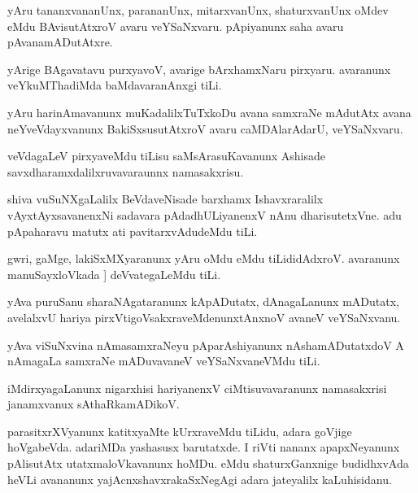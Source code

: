 \documentclass{article}
\begin{document}
\begin{mn}%
yAru tananxvananUnx, parananUnx, mitarxvanUnx, shaturxvanUnx oMdev eMdu BAvisutAtxroV 
avaru veYSaNxvaru. pApiyanunx saha avaru pAvanamADutAtxre.
\end{mn}

\begin{mn}%
yArige BAgavatavu purxyavoV, avarige bArxhamxNaru pirxyaru. avaranunx veYkuMThadiMda 
baMdavaranAnxgi tiLi.
\end{mn}

\begin{mn}%
yAru harinAmavanunx muKadalilxTuTxkoDu avana samxraNe mAdutAtx avana neYveVdayxvanunx 
BakiSxsusutAtxroV avaru caMDAlarAdarU, veYSaNxvaru.
\end{mn}

\begin{mn}%
veVdagaLeV pirxyaveMdu tiLisu saMsArasuKavanunx Ashisade savxdharamxdalilxruvavaraunnx 
namasakxrisu.
\end{mn}

\begin{mn}%
shiva vuSuNXgaLalilx BeVdaveNisade barxhamx Ishavxraralilx vAyxtAyxsavanenxNi sadavara 
pAdadhULiyanenxV nAnu dharisutetxVne. adu pApaharavu matutx ati pavitarxvAdudeMdu tiLi.
\end{mn}

\begin{mn}%
gwri, gaMge, lakiSxMXyaranunx yAru oMdu eMdu tiLididAdxroV. avaranunx manuSayxloVkada ]
deVvategaLeMdu tiLi.
\end{mn}

\begin{mn}%
yAva puruSanu sharaNAgataranunx kApADutatx, dAnagaLanunx mADutatx, avelalxvU hariya 
pirxVtigoVsakxraveMdenunxtAnxnoV avaneV veYSaNxvanu.
\end{mn}

\begin{mn}%
yAva viSuNxvina nAmasamxraNeyu pAparAshiyanunx nAshamADutatxdoV A nAmagaLa samxraNe 
mADuvavaneV veYSaNxvaneVMdu tiLi.
\end{mn}

\begin{mn}%
iMdirxyagaLanunx nigarxhisi hariyanenxV ciMtisuvavaranunx namasakxrisi janamxvanux 
sAthaRkamADikoV.
\end{mn}

\begin{mn}%
parasitxrXVyanunx katitxyaMte kUrxraveMdu tiLidu, adara goVjige hoVgabeVda. adariMDa 
yashasusx barutatxde. I riVti nananx apapxNeyanunx pAlisutAtx utatxmaloVkavanunx hoMDu. 
eMdu shaturxGanxnige budidhxvAda heVLi avananunx yajAcnxshavxrakaSxNegAgi adara jateyalilx 
kaLuhisidanu.
\end{mn}
\end{document}

